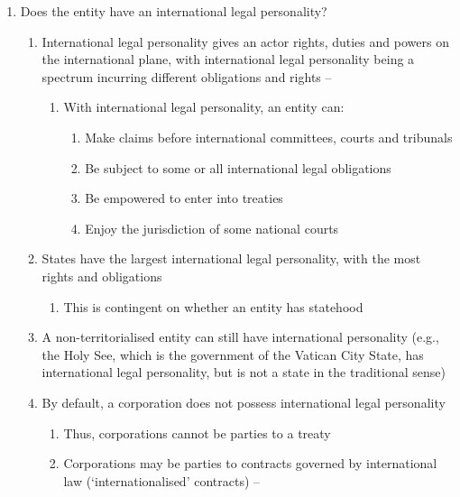 \begin{enumerate}
    \item Does the entity have an international legal personality?
    \begin{enumerate}
        \item International legal personality gives an actor rights, duties and powers on the international plane, with international legal personality being a spectrum incurring different obligations and rights -- 
        \begin{enumerate}
            \item With international legal personality, an entity can:
            \begin{enumerate}
                \item Make claims before international committees, courts and tribunals
                \item Be subject to some or all international legal obligations
                \item Be empowered to enter into treaties
                \item Enjoy the jurisdiction of some national courts
            \end{enumerate}
        \end{enumerate}
        \item States have the largest international legal personality, with the most rights and obligations
        \begin{enumerate}
            \item This is contingent on whether an entity has statehood
        \end{enumerate}
        \item A non-territorialised entity can still have international personality (e.g., the Holy See, which is the government of the Vatican City State, has international legal personality, but is not a state in the traditional sense)
        \item By default, a corporation does not possess international legal personality
        \begin{enumerate}
            \item Thus, corporations cannot be parties to a treaty
            \item Corporations may be parties to contracts governed by international law (`internationalised' contracts) -- 

\end{enumerate}
\end{enumerate}
\end{enumerate}
